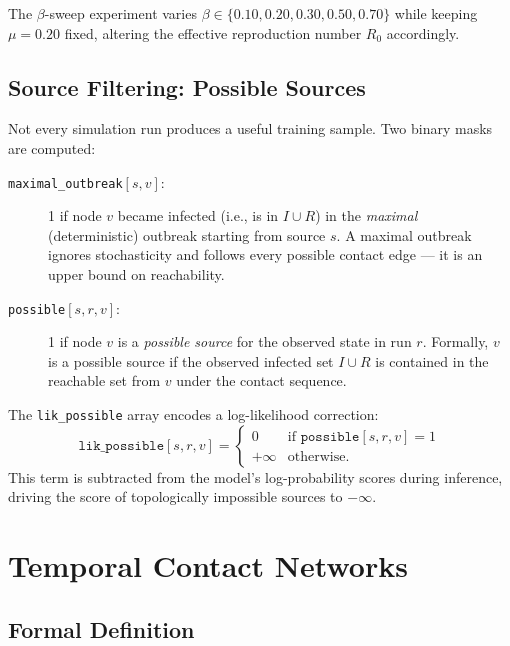 \documentclass[12pt,a4paper]{report}
\begin{document}
The $\beta$-sweep experiment varies $\beta \in \{0.10, 0.20, 0.30, 0.50,
0.70\}$ while keeping $\mu = 0.20$ fixed, altering the effective reproduction
number $R_0$ accordingly.

\section{Source Filtering: Possible Sources}

Not every simulation run produces a useful training sample. Two binary masks
are computed:

\begin{description}
  \item[\texttt{maximal\_outbreak}{$[s,v]$}:] 1 if node $v$ became infected
    (i.e., is in $I \cup R$) in the \emph{maximal} (deterministic) outbreak
    starting from source $s$. A maximal outbreak ignores stochasticity and
    follows every possible contact edge — it is an upper bound on reachability.
  \item[\texttt{possible}{$[s,r,v]$}:] 1 if node $v$ is a \emph{possible
    source} for the observed state in run $r$. Formally, $v$ is a possible
    source if the observed infected set $I \cup R$ is contained in the reachable
    set from $v$ under the contact sequence.
\end{description}

The \texttt{lik\_possible} array encodes a log-likelihood correction:
\begin{equation}
  \texttt{lik\_possible}[s, r, v] =
  \begin{cases} 0 & \text{if } \texttt{possible}[s,r,v] = 1 \\ +\infty & \text{otherwise.} \end{cases}
\end{equation}
This term is subtracted from the model's log-probability scores during
inference, driving the score of topologically impossible sources to $-\infty$.

\chapter{Temporal Contact Networks}
\label{chap:temporal_networks}

\section{Formal Definition}
\end{document}
